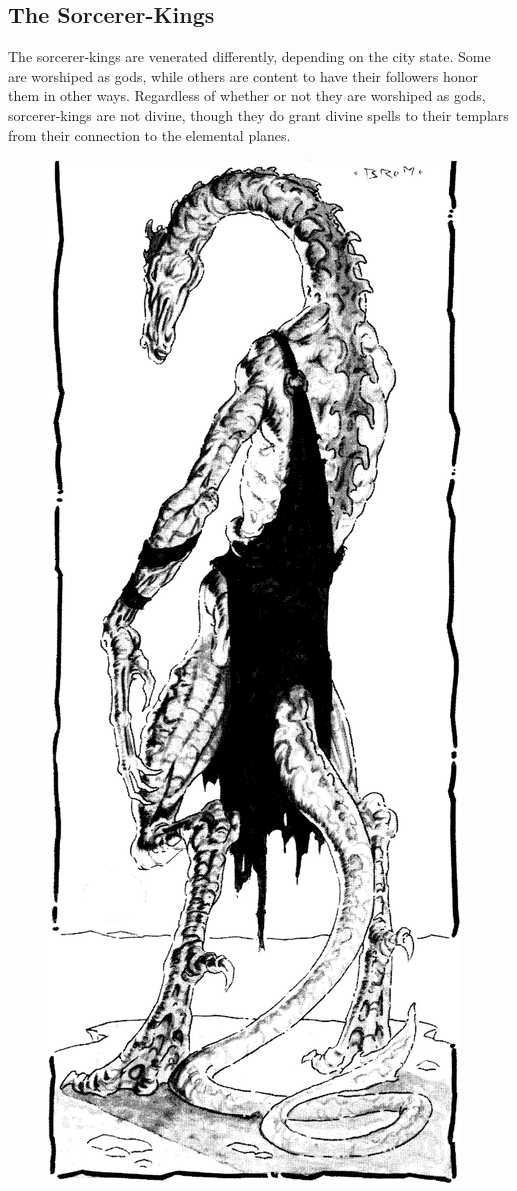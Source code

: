 \subsection{The Sorcerer-Kings}
The sorcerer-kings are venerated differently, depending on the city state. Some are worshiped as gods, while others are content to have their followers honor them in other ways. Regardless of whether or not they are worshiped as gods, sorcerer-kings are not divine, though they do grant divine spells to their templars from their connection to the elemental planes.

\begin{figure}[t!]
\centering
\includegraphics[width=\columnwidth]{images/dragon-2.png}

\end{figure}
